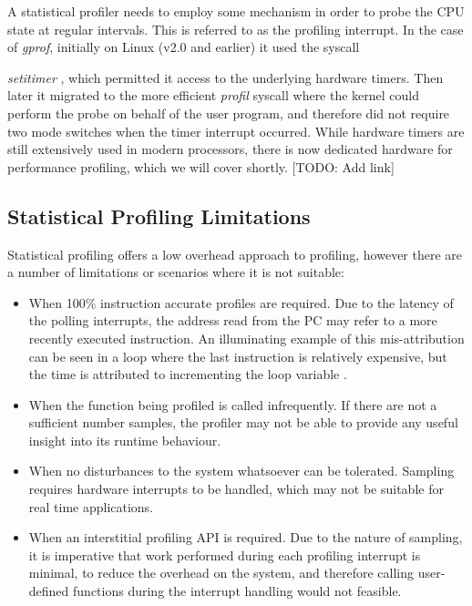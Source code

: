 A statistical profiler needs to employ some mechanism in order to probe the CPU state at regular intervals. This is referred to as the profiling interrupt. In the case of \textit{gprof}, initially on Linux (v2.0 and earlier) it used the syscall {\textit{setitimer} \cite{DocsGProfImpl}, which permitted it access to the underlying hardware timers. Then later it migrated to the more efficient \textit{profil} syscall where the kernel could perform the probe on behalf of the user program, and therefore did not require two mode switches when the timer interrupt occurred. While hardware timers are still extensively used in modern processors, there is now dedicated hardware for performance profiling, which we will cover shortly. [TODO: Add link]

\subsection{Statistical Profiling Limitations}

Statistical profiling offers a low overhead approach to profiling, however there are a number of limitations or scenarios where it is not suitable:

\begin{itemize}
    \item When 100\% instruction accurate profiles are required. Due to the latency of the polling interrupts, the address read from the PC may refer to a more recently executed instruction. An illuminating example of this mis-attribution can be seen in a loop where the last instruction is relatively expensive, but the time is attributed to incrementing the loop variable \cite{DocsOProfileInter}.
    \item When the function being profiled is called infrequently. If there are not a sufficient number samples, the profiler may not be able to provide any useful insight into its runtime behaviour.
    \item When no disturbances to the system whatsoever can be tolerated. Sampling requires hardware interrupts to be handled, which may not be suitable for real time applications.
    \item When an interstitial profiling API is required. Due to the nature of sampling, it is imperative that work performed during each profiling interrupt is minimal, to reduce the overhead on the system, and therefore calling user-defined functions during the interrupt handling would not feasible.
\end{itemize}

}
